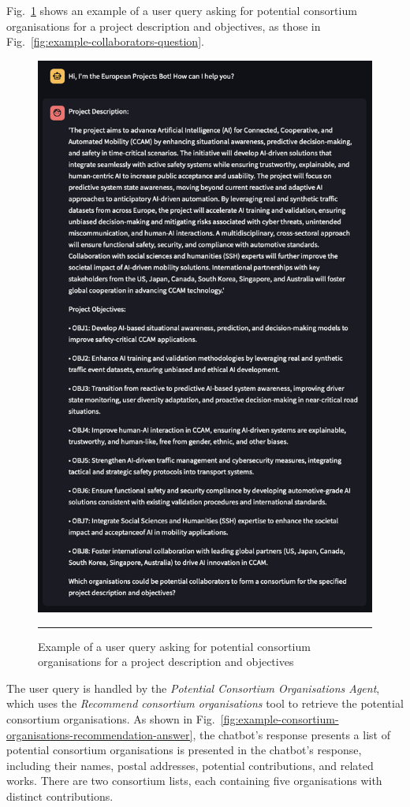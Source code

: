 Fig.~\ref{fig:example-consortium-organisations-recommendation-question} shows an example of a user query asking for potential consortium organisations for a project description and objectives, as those in Fig.~\ref{fig:example-collaborators-question}.

\begin{figure}[htbp]
    \centering
 \includegraphics[width=.4\textwidth]{figures/implementation/example-consortium-organisations-recommendation-question.png}
     \rule{35em}{0.5pt}
    \caption{Example of a user query asking for potential consortium organisations for a project description and objectives}
 \label{fig:example-consortium-organisations-recommendation-question}
\end{figure}

The user query is handled by the \textit{Potential Consortium Organisations Agent}, which uses the \textit{Recommend consortium organisations} tool to retrieve the potential consortium organisations.
As shown in Fig.~\ref{fig:example-consortium-organisations-recommendation-answer}, the chatbot's response presents a list of potential consortium organisations is presented in the chatbot's response, including their names, postal addresses, potential contributions, and related works.
There are two consortium lists, each containing five organisations with distinct contributions.

